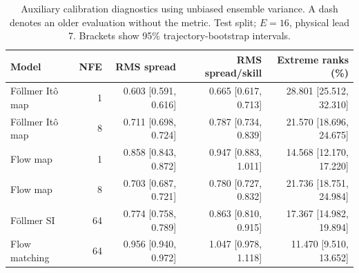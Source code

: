 \begin{table}[t]
\centering
\small
\setlength{\tabcolsep}{3pt}
\caption{Auxiliary calibration diagnostics using unbiased ensemble variance. A dash denotes an older evaluation without the metric. Test split; $E=16$, physical lead 7. Brackets show 95\% trajectory-bootstrap intervals.}
\label{tab:map-rms-calibration}
\begin{tabular}{lrrrr}
\toprule
Model & NFE & RMS spread & RMS spread/skill & Extreme ranks (\%) \\
\midrule
Föllmer Itô map & 1 & 0.603 [0.591, 0.616] & 0.665 [0.617, 0.713] & 28.801 [25.512, 32.310] \\
Föllmer Itô map & 8 & 0.711 [0.698, 0.724] & 0.787 [0.734, 0.839] & 21.570 [18.696, 24.675] \\
\addlinespace
Flow map & 1 & 0.858 [0.843, 0.872] & 0.947 [0.883, 1.011] & 14.568 [12.170, 17.220] \\
Flow map & 8 & 0.703 [0.687, 0.721] & 0.780 [0.727, 0.832] & 21.736 [18.751, 24.984] \\
\addlinespace
Föllmer SI & 64 & 0.774 [0.758, 0.789] & 0.863 [0.810, 0.915] & 17.367 [14.982, 19.894] \\
\addlinespace
Flow matching & 64 & 0.956 [0.940, 0.972] & 1.047 [0.978, 1.118] & 11.470 [9.510, 13.652] \\
\bottomrule
\end{tabular}
\end{table}
